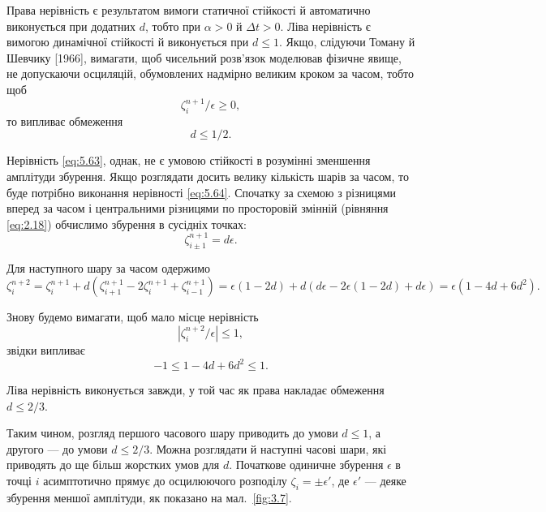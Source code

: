 Права нерівність є результатом вимоги статичної стійкості й автоматично виконується при додатних $d$, тобто при $\alpha > 0$ й $\Delta t > 0$. Ліва нерівність є вимогою динамічної стійкості й виконується при $d \le 1$. Якщо, слідуючи Томану й Шевчику [1966], вимагати, щоб чисельний розв'язок моделював фізичне явище, не допускаючи осциляцій, обумовлених надмірно великим кроком за часом, тобто щоб
\begin{equation}
    \label{eq:5.63}
    \zeta_i^{n + 1} / \epsilon \ge 0 ,
\end{equation}
то випливає обмеження
\begin{equation}
    \label{eq:5.64}
    d \le 1/2.
\end{equation}

Нерівність \eqref{eq:5.63}, однак, не є умовою стійкості в розумінні зменшення амплітуди збурення. Якщо розглядати досить велику кількість шарів за часом, то буде потрібно виконання нерівності \eqref{eq:5.64}. Спочатку за схемою з різницями вперед за часом і центральними різницями по просторовій змінній (рівняння \eqref{eq:2.18}) обчислимо збурення в сусідніх точках:
\begin{equation}
    \label{eq:5.65}
    \zeta_{i \pm 1}^{n + 1} = d \epsilon.
\end{equation}

Для наступного шару за часом одержимо
\begin{equation}
    \label{eq:5.66}
    \zeta_i^{n + 2} = \zeta_i^{n + 1} + d ( \zeta_{i + 1}^{n + 1} - 2 \zeta_i^{n + 1} + \zeta_{i - 1}^{n + 1}) = \epsilon (1 - 2 d) + d (d \epsilon - 2 \epsilon(1 - 2d) + d \epsilon) = \epsilon (1 - 4 d + 6 d^2).
\end{equation}

Знову будемо вимагати, щоб мало місце нерівність
\begin{equation}
    \label{eq:5.67}
    |\zeta_i^{n + 2} / \epsilon | \le 1,
\end{equation}
звідки випливає
\begin{equation}
    \label{eq:5.68}
    -1 \le 1 - 4 d + 6 d^2 \le 1.
\end{equation}

Ліва нерівність виконується завжди, у той час як права накладає обмеження $d \le 2 / 3$. \medskip

Таким чином, розгляд першого часового шару приводить до умови $d \le 1$, а другого --- до умови $d \le 2 / 3$. Можна розглядати й наступні часові шари, які приводять до ще більш жорстких умов для $d$. Початкове одиничне збурення $\epsilon$ в точці $i$ асимптотично прямує до осцилюючого розподілу $\zeta_i = \pm \epsilon'$, де $\epsilon'$ --- деяке збурення меншої амплітуди, як показано на мал.~\ref{fig:3.7}.

